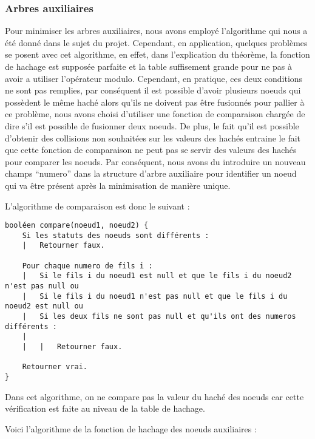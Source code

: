 \documentclass[15pt, a4paper]{article}
\begin{document}
\subsubsection{Arbres auxiliaires} 

Pour minimiser les arbres auxiliaires, nous avons employé l'algorithme
qui nous a été donné dans le sujet du projet. Cependant, en application, quelques 
problèmes se posent avec cet algorithme, en effet, dans l'explication du théorème,
la fonction de hachage est supposée parfaite et la table suffisement grande pour
ne pas à avoir a utiliser l'opérateur modulo. Cependant, en pratique, ces deux 
conditions ne sont pas remplies, par conséquent il est possible d'avoir plusieurs
noeuds qui possèdent le même haché alors qu'ils ne doivent pas être fusionnés pour
pallier à ce problème, nous avons choisi d'utiliser une fonction de comparaison
chargée de dire s'il est possible de fusionner deux noeuds. De plus, le fait qu'il
est possible d'obtenir des collisions non souhaitées sur les valeurs des hachés
entraine le fait que cette fonction de comparaison ne peut pas se servir des valeurs
des hachés pour comparer les noeuds. Par conséquent, nous avons du introduire un 
nouveau champs ``numero'' dans la structure d'arbre auxiliaire pour identifier un
noeud qui va être présent après la minimisation de manière unique.

\bigskip

\noindent L'algorithme de comparaison est donc le suivant :

\begin{verbatim}
booléen compare(noeud1, noeud2) {
    Si les statuts des noeuds sont différents :
    |   Retourner faux.

    Pour chaque numero de fils i :
    |   Si le fils i du noeud1 est null et que le fils i du noeud2 n'est pas null ou
    |   Si le fils i du noeud1 n'est pas null et que le fils i du noeud2 est null ou
    |   Si les deux fils ne sont pas null et qu'ils ont des numeros différents :
    |
    |   |   Retourner faux.

    Retourner vrai.
}
\end{verbatim}

\noindent Dans cet algorithme, on ne compare pas la valeur du haché des noeuds 
car cette vérification est faite au niveau de la table de hachage. 

\bigskip

\noindent Voici l'algorithme de la fonction de hachage des noeuds auxiliaires :
\end{document}
